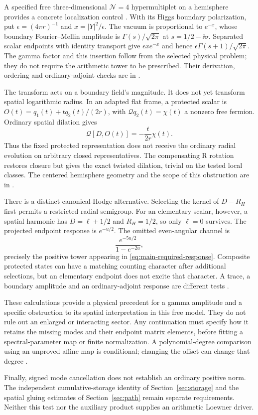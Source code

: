 A specified free three-dimensional $\mathcal N=4$ hypermultiplet
on a hemisphere provides a concrete localization control
\cite{DPYHiggs,DedushenkoGluing}. With its Higgs boundary
polarization, put $\epsilon=(4\pi r)^{-1}$ and
$x=|Y|^2/\epsilon$. The vacuum is proportional to $e^{-x}$,
whose boundary Fourier--Mellin amplitude is
$\Gamma(s)/\sqrt{2\pi}$ at $s=1/2-\ii\sigma$.
Separated scalar endpoints with identity transport give
$\epsilon x e^{-x}$ and hence
$\epsilon\Gamma(s+1)/\sqrt{2\pi}$. The gamma factor and this
insertion follow from the selected physical problem; they do not
require the arithmetic tower to be prescribed. Their derivation,
ordering and ordinary-adjoint checks are in
\cite[Sections~S12.1--S12.2]{Supplement}.

The transform acts on a boundary field's magnitude. It does not
yet transform spatial logarithmic radius. In an adapted flat frame,
a protected scalar is
$O(t)=q_1(t)+tq_2(t)/(2r)$, with
$\mathcal Qq_2(t)=\chi(t)$ a nonzero free fermion.
Ordinary spatial dilation gives
\begin{equation}\label{eq:main-localized-nonclosure}
 \mathcal Q[D,O(t)]=-\frac{t}{2r}\chi(t).
\end{equation}
Thus the fixed protected representation does not receive the
ordinary radial evolution on arbitrary closed representatives.
The compensating R rotation restores closure but gives the exact
twisted dilation, trivial on the tested local classes. The centered
hemisphere geometry and the scope of this obstruction are in
\cite[Section~S12.3]{Supplement}.

There is a distinct canonical-Hodge alternative. Selecting the
kernel of $D-R_H$ first permits a restricted radial semigroup.
For an elementary scalar, however, a spatial harmonic has
$D=\ell+1/2$ and $R_H=1/2$, so only $\ell=0$ survives.
The projected endpoint response is $e^{-u/2}$.
The omitted even-angular channel is
\[
 \frac{e^{-5u/2}}{1-e^{-2u}},
\]
precisely the positive tower appearing in
\eqref{eq:main-required-response}. Composite protected states can
have a matching counting character after additional selections,
but an elementary endpoint does not excite that character.
A trace, a boundary amplitude and an ordinary-adjoint response
are different tests \cite[Sections~S12.4--S12.5]{Supplement}.

These calculations provide a physical precedent for a gamma
amplitude and a specific obstruction to its spatial interpretation
in this free model. They do not rule out an enlarged or interacting
sector. Any continuation must specify how it retains the missing
modes and their endpoint matrix elements, before fitting a
spectral-parameter map or finite normalization.
A polynomial-degree comparison using an unproved affine map is
conditional; changing the offset can change that degree
\cite[Section~S12.6]{Supplement}.

Finally, signed mode cancellation does not establish an
ordinary positive norm. The independent cumulative-storage
identity of Section~\ref{sec:storage} and the spatial gluing
estimates of Section~\ref{sec:path} remain separate requirements.
Neither this test nor the auxiliary product supplies an
arithmetic Loewner driver.
